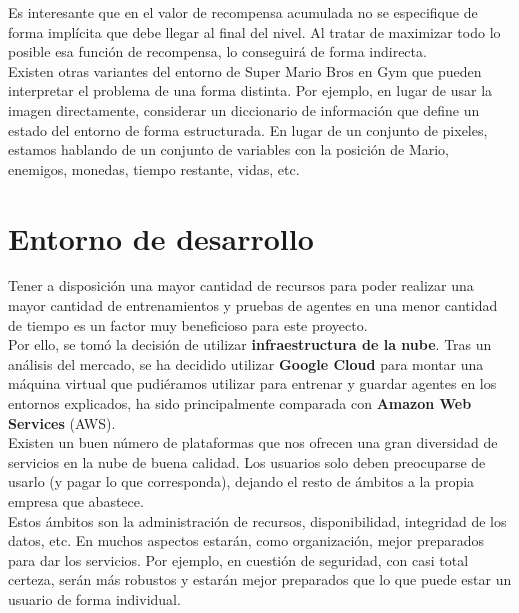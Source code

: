 \documentclass[11pt,fleqn]{book} %
\begin{document}
Es interesante que en el valor de recompensa acumulada no se especifique de forma implícita que debe llegar al final del nivel. Al tratar de maximizar todo lo posible esa función de recompensa, lo conseguirá de forma indirecta. \\


Existen otras variantes del entorno de Super Mario Bros en Gym que pueden interpretar el problema de una forma distinta. Por ejemplo, en lugar de usar la imagen directamente, considerar un diccionario de información que define un estado del entorno de forma estructurada. En lugar de un conjunto de pixeles, estamos hablando de un conjunto de variables con la posición de Mario, enemigos, monedas, tiempo restante, vidas, etc.

\chapter{Entorno de desarrollo}\label{sec:cloud}

Tener a disposición una mayor cantidad de recursos para poder realizar una mayor cantidad de entrenamientos y pruebas de agentes en una menor cantidad de tiempo es un factor muy beneficioso para este proyecto. \\

Por ello, se tomó la decisión de utilizar \textbf{infraestructura de la nube}. Tras un análisis del mercado, se ha decidido utilizar \textbf{Google Cloud} para montar una máquina virtual que pudiéramos utilizar para entrenar y guardar agentes en los entornos explicados, ha sido principalmente comparada con \textbf{Amazon Web Services} (AWS).\\

Existen un buen número de plataformas que nos ofrecen una gran diversidad de servicios en la nube de buena calidad. Los usuarios solo deben preocuparse de usarlo (y pagar lo que corresponda), dejando el resto de ámbitos a la propia empresa que abastece. \\

Estos ámbitos son la administración de recursos, disponibilidad, integridad de los datos, etc. En muchos aspectos estarán, como organización, mejor preparados para dar los servicios. Por ejemplo, en cuestión de seguridad, con casi total certeza, serán más robustos y estarán mejor preparados que lo que puede estar un usuario de forma individual. \\
\end{document}
